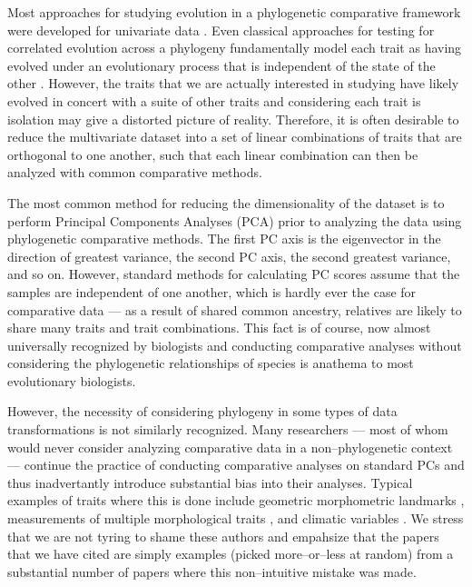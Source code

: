 \documentclass[a4paper,12pt]{article}
\begin{document}
Most approaches for studying evolution in a phylogenetic comparative framework were developed for univariate data \citep[reviewed in][]{PennellHarmon}. Even classical approaches for testing for correlated evolution across a phylogeny \citep[e.g.,][]{Felsenstein1985, Grafen1989, HarveyPagel1991} fundamentally model each trait as having evolved under an evolutionary process that is independent of the state of the other \citep{HansenOrzack2005}. However, the traits that we are actually interested in studying have likely evolved in concert with a suite of other traits and considering each trait is isolation may give a distorted picture of reality. Therefore, it is often desirable to reduce the multivariate dataset into a set of linear combinations of traits that are orthogonal to one another, such that each linear combination can then be analyzed with common comparative methods.

The most common method for reducing the dimensionality of the dataset is to perform Principal Components Analyses (PCA) prior to analyzing the data using phylogenetic comparative methods. The first PC axis is the eigenvector in the direction of greatest variance, the second PC axis, the second greatest variance, and so on. However, standard methods for calculating PC scores assume that the samples are independent of one another, which is hardly ever the case for comparative data --- as a result of shared common ancestry, relatives are likely to share many traits and trait combinations. This fact is of course, now almost universally recognized by biologists and conducting comparative analyses without considering the phylogenetic relationships of species is anathema to most evolutionary biologists. 

However, the necessity of considering phylogeny in some types of data transformations \citep{Revell2008} is not similarly recognized. Many researchers --- most of whom would never consider analyzing comparative data in a non--phylogenetic context --- continue the practice of conducting comparative analyses on standard PCs and thus inadvertantly introduce substantial bias into their analyses. Typical examples of traits where this is done include geometric morphometric landmarks \citep[e.g.,][]{Dornburg2011, Hunt2013}, measurements of multiple morphological traits \citep[e.g.,][]{Harmon2010, BergmannIrshick2012, Weir2012, Pienaar2013}, and climatic variables \citep[e.g.,][]{KozakWiens2010, Schnitzler2012}. We stress that we are not tyring to shame these authors and empahsize that the papers that we have cited are simply examples (picked more--or--less at random) from a substantial number of papers where this non--intuitive mistake was made.
\end{document}
